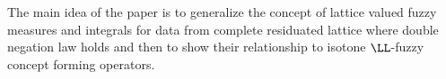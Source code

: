 
The main idea of the paper is to generalize the concept of lattice valued fuzzy measures and integrals for data from complete residuated lattice where double negation law holds and then to show their relationship to isotone $\LL$-fuzzy concept forming operators.

